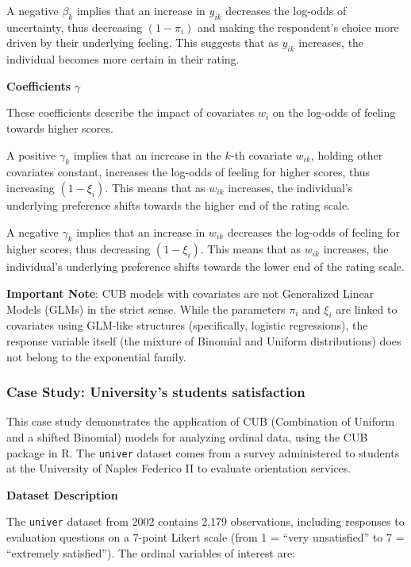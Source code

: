 \documentclass[
  letterpaper,
  DIV=11,
  numbers=noendperiod]{scrartcl}
\begin{document}
A negative \(\beta_k\) implies that an increase in \(y_{ik}\) decreases
the log-odds of uncertainty, thus decreasing \((1−\pi_i)\) and making
the respondent's choice more driven by their underlying feeling. This
suggests that as \(y_{ik}\) increases, the individual becomes more
certain in their rating.

\textbf{Coefficients} \(\gamma\)

These coefficients describe the impact of covariates \(w_i\) on the
log-odds of feeling towards higher scores.

A positive \(\gamma_k\) implies that an increase in the \(k\)-th
covariate \(w_{ik}\), holding other covariates constant, increases the
log-odds of feeling for higher scores, thus increasing \((1-\xi_i)\).
This means that as \(w_{ik}\) increases, the individual's underlying
preference shifts towards the higher end of the rating scale.

A negative \(\gamma_k\) implies that an increase in \(w_{ik}\) decreases
the log-odds of feeling for higher scores, thus decreasing
\((1-\xi_i)\). This means that as \(w_{ik}\) increases, the individual's
underlying preference shifts towards the lower end of the rating scale.

\textbf{Important Note}: CUB models with covariates are not Generalized
Linear Models (GLMs) in the strict sense. While the parameters \(\pi_i\)
and \(\xi_i\) are linked to covariates using GLM-like structures
(specifically, logistic regressions), the response variable itself (the
mixture of Binomial and Uniform distributions) does not belong to the
exponential family.

\hypertarget{case-study-universitys-students-satisfaction}{%
\subsubsection{Case Study: University's students
satisfaction}\label{case-study-universitys-students-satisfaction}}

This case study demonstrates the application of CUB (Combination of
Uniform and a shifted Binomial) models for analyzing ordinal data, using
the CUB package in R. The \texttt{univer} dataset comes from a survey
administered to students at the University of Naples Federico II to
evaluate orientation services.

\textbf{Dataset Description}

The \texttt{univer} dataset from 2002 contains 2,179 observations,
including responses to evaluation questions on a 7-point Likert scale
(from 1 = ``very unsatisfied'' to 7 = ``extremely satisfied''). The
ordinal variables of interest are:
\end{document}
